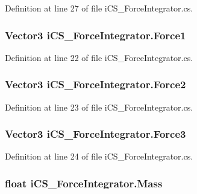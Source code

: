 Definition at line 27 of file i\+C\+S\+\_\+\+Force\+Integrator.\+cs.

\hypertarget{classi_c_s___force_integrator_aef1c160690c3c63598dbf5920e97e21b}{
\subsubsection[{Force1}]{\setlength{\rightskip}{0pt plus 5cm}Vector3 i\+C\+S\+\_\+\+Force\+Integrator.\+Force1\hspace{0.3cm}{\ttfamily [set]}}}\label{classi_c_s___force_integrator_aef1c160690c3c63598dbf5920e97e21b}


Definition at line 22 of file i\+C\+S\+\_\+\+Force\+Integrator.\+cs.

\hypertarget{classi_c_s___force_integrator_aa4d529288f969bc8142b07f76f231ebd}{
\subsubsection[{Force2}]{\setlength{\rightskip}{0pt plus 5cm}Vector3 i\+C\+S\+\_\+\+Force\+Integrator.\+Force2\hspace{0.3cm}{\ttfamily [set]}}}\label{classi_c_s___force_integrator_aa4d529288f969bc8142b07f76f231ebd}


Definition at line 23 of file i\+C\+S\+\_\+\+Force\+Integrator.\+cs.

\hypertarget{classi_c_s___force_integrator_a1d20f2763147f1f6b4981a4440e6dfa9}{
\subsubsection[{Force3}]{\setlength{\rightskip}{0pt plus 5cm}Vector3 i\+C\+S\+\_\+\+Force\+Integrator.\+Force3\hspace{0.3cm}{\ttfamily [set]}}}\label{classi_c_s___force_integrator_a1d20f2763147f1f6b4981a4440e6dfa9}


Definition at line 24 of file i\+C\+S\+\_\+\+Force\+Integrator.\+cs.

\hypertarget{classi_c_s___force_integrator_a5e7f3a5aedcae2c245670af79966cd8f}{
\subsubsection[{Mass}]{\setlength{\rightskip}{0pt plus 5cm}float i\+C\+S\+\_\+\+Force\+Integrator.\+Mass\hspace{0.3cm}{\ttfamily [set]}}}\label{classi_c_s___force_integrator_a5e7f3a5aedcae2c245670af79966cd8f}


